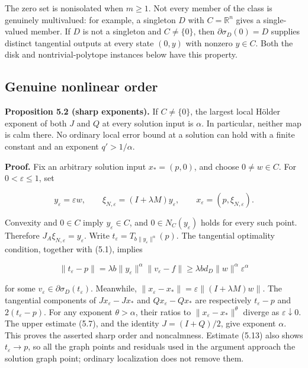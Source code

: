 \documentclass[11pt,a4paper]{article}
\theoremstyle{plain}
\theoremstyle{definition}
\theoremstyle{remark}
\begin{document}
The zero set is nonisolated when \(m\ge1\). Not every member of the
class is genuinely multivalued: for example, a singleton \(D\) with
\(C=\mathbb R^n\) gives a single-valued member. If \(D\) is not a
singleton and \(C\ne\{0\}\), then \(\partial\sigma_D(0)=D\) supplies
distinct tangential outputs at every state \((0,y)\) with nonzero
\(y\in C\). Both the disk and nontrivial-polytope instances below have
this property.

\hypertarget{genuine-nonlinear-order}{%
\subsection{Genuine nonlinear
order}\label{genuine-nonlinear-order}}

\textbf{Proposition 5.2 (sharp exponents).} If \(C\ne\{0\}\), the
largest local Hölder exponent of both \(J\) and \(Q\) at every solution
input is \(\alpha\). In particular, neither map is calm there. No
ordinary local error bound at a solution can hold with a finite constant
and an exponent \(q'>1/\alpha\).

\textbf{Proof.} Fix an arbitrary solution input \(x_*=(p,0)\), and
choose \(0\ne w\in C\). For \(0<\varepsilon\le1\), set

\[
y_\varepsilon=\varepsilon w,
\qquad \xi_{N,\varepsilon}=(I+\lambda M)y_\varepsilon,
\qquad x_\varepsilon=(p,\xi_{N,\varepsilon}).
\tag{5.16}
\]

Convexity and \(0\in C\) imply \(y_\varepsilon\in C\), and
\(0\in N_C(y_\varepsilon)\) holds for every such point. Therefore
\(J_A\xi_{N,\varepsilon}=y_\varepsilon\). Write
\(t_\varepsilon=T_{b\|y_\varepsilon\|^\alpha}(p)\). The tangential
optimality condition, together with (5.1), implies

\[
\|t_\varepsilon-p\|
=\lambda b\|y_\varepsilon\|^\alpha
\|v_\varepsilon-f\|
\ge\lambda bd_D\|w\|^\alpha\varepsilon^\alpha
\tag{5.17}
\]

for some \(v_\varepsilon\in\partial\sigma_D(t_\varepsilon)\). Meanwhile,
\(\|x_\varepsilon-x_*\|=\varepsilon\|(I+\lambda M)w\|\). The tangential
components of \(Jx_\varepsilon-Jx_*\) and \(Qx_\varepsilon-Qx_*\) are
respectively \(t_\varepsilon-p\) and \(2(t_\varepsilon-p)\). For any
exponent \(\theta>\alpha\), their ratios to
\(\|x_\varepsilon-x_*\|^\theta\) diverge as \(\varepsilon\downarrow0\).
The upper estimate (5.7), and the identity \(J=(I+Q)/2\), give exponent
\(\alpha\). This proves the asserted sharp order and noncalmness.
Estimate (5.13) also shows \(t_\varepsilon\to p\), so all the graph
points and residuals used in the argument approach the solution graph
point; ordinary localization does not remove them.
\end{document}
